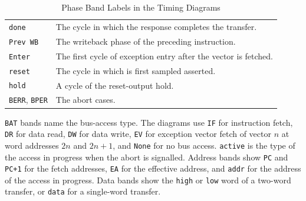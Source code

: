 \begin{table}[H]
\begin{tabularx}{\textwidth}{@{}p{4.2cm}X@{}}
		\texttt{done}                                                          & The cycle in which the response completes the transfer.                                                                                           \\
		\texttt{Prev WB}                                                       & The writeback phase of the preceding instruction.                                                                                                 \\
		\texttt{Enter}                                                         & The first cycle of exception entry after the vector is fetched.                                                                                   \\
		\texttt{reset}                                                         & The cycle in which \activelow{RSTI} is first sampled asserted.                                                                                    \\
		\texttt{hold}                                                          & A cycle of the reset-output hold.                                                                                                                 \\
		\texttt{BERR}, \texttt{BPER}                                           & The abort cases.                                                                                                                                  \\
		\bottomrule
	\end{tabularx}
	\caption{Phase Band Labels in the Timing Diagrams}
	\label{tab:figure-phase-labels}
\end{table}

\texttt{BAT} bands name the bus-access type. The diagrams use \texttt{IF} for instruction fetch, \texttt{DR} for data
read, \texttt{DW} for data write, \texttt{EV} for exception vector fetch of vector $n$ at word addresses $2n$ and
$2n+1$, and \texttt{None} for no bus access. \texttt{active} is the type of the access in progress when the abort is
signalled. Address bands show \texttt{PC} and \texttt{PC+1} for the fetch addresses, \texttt{EA} for the effective
address, and \texttt{addr} for the address of the access in progress. Data bands show the \texttt{high} or \texttt{low}
word of a two-word transfer, or \texttt{data} for a single-word transfer.

